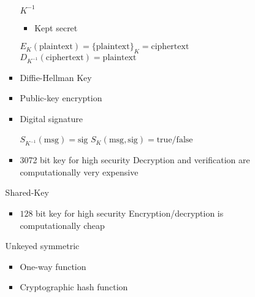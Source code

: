 \begin{itemize}
\begin{itemize}
\begin{itemize}
\begin{itemize}
                        \end{itemize}
                     $K^{-1}$
                        \begin{itemize}
                            \item Kept secret
                        \end{itemize}
                     $E_K(\text{plaintext}) = \{\text{plaintext}\}_K = \text{ciphertext}$
                     $D_{K^{-1}}(\text{ciphertext}) = \text{plaintext}$
                    \item Diffie-Hellman Key
                    \item Public-key encryption
                    \item Digital signature
                        \begin{itemize}
                             $S_{K^{-1}}(\text{msg}) = \text{sig}$
                             $S_K(\text{msg}, \text{sig}) = \text{true/false}$
                        \end{itemize}
                    \item 3072 bit key for high security
                    \icon Decryption and verification are computationally very expensive
                \end{itemize}
             Shared-Key
                \begin{itemize}
                     $K$
                        \begin{itemize}
                            \item Shared with recipient
                        \end{itemize}
                     $K$
                        \begin{itemize}
                            \item Shared with recipient
                        \end{itemize}
                     $E_K(\text{plaintext}) = \{\text{plaintext}\}_K = \text{ciphertext}$
                     $D_K(\text{ciphertext}) = \text{plaintext}$
                     Encryption/decryption functions
                    \item $128$ bit key for high security
                    \ipro Encryption/decryption is computationally cheap
                \end{itemize}
             Unkeyed symmetric
                \begin{itemize}
                    \item One-way function
                    \item Cryptographic hash function
                \end{itemize}
        \end{itemize}
\end{itemize}

